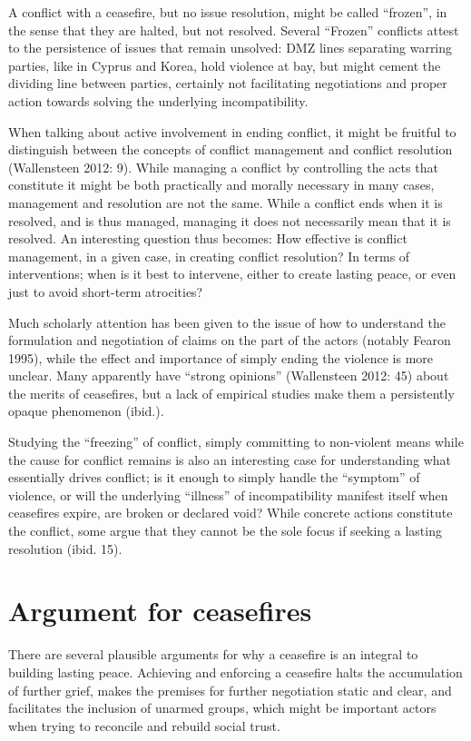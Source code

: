 \documentclass[12pt,twoside]{reedthesis}
\begin{document}
A conflict with a ceasefire, but no issue resolution, might be called
``frozen'', in the sense that they are halted, but not resolved. Several
``Frozen'' conflicts attest to the persistence of issues that remain
unsolved: DMZ lines separating warring parties, like in Cyprus and
Korea, hold violence at bay, but might cement the dividing line between
parties, certainly not facilitating negotiations and proper action
towards solving the underlying incompatibility.

When talking about active involvement in ending conflict, it might be
fruitful to distinguish between the concepts of conflict management and
conflict resolution (Wallensteen 2012: 9). While managing a conflict by
controlling the acts that constitute it might be both practically and
morally necessary in many cases, management and resolution are not the
same. While a conflict ends when it is resolved, and is thus managed,
managing it does not necessarily mean that it is resolved. An
interesting question thus becomes: How effective is conflict management,
in a given case, in creating conflict resolution? In terms of
interventions; when is it best to intervene, either to create lasting
peace, or even just to avoid short-term atrocities?

Much scholarly attention has been given to the issue of how to
understand the formulation and negotiation of claims on the part of the
actors (notably Fearon 1995), while the effect and importance of simply
ending the violence is more unclear. Many apparently have ``strong
opinions'' (Wallensteen 2012: 45) about the merits of ceasefires, but a
lack of empirical studies make them a persistently opaque phenomenon
(ibid.).

Studying the ``freezing'' of conflict, simply committing to non-violent
means while the cause for conflict remains is also an interesting case
for understanding what essentially drives conflict; is it enough to
simply handle the ``symptom'' of violence, or will the underlying
``illness'' of incompatibility manifest itself when ceasefires expire,
are broken or declared void? While concrete actions constitute the
conflict, some argue that they cannot be the sole focus if seeking a
lasting resolution (ibid. 15).

\section{Argument for ceasefires}\label{argument-for-ceasefires}

There are several plausible arguments for why a ceasefire is an integral
to building lasting peace. Achieving and enforcing a ceasefire halts the
accumulation of further grief, makes the premises for further
negotiation static and clear, and facilitates the inclusion of unarmed
groups, which might be important actors when trying to reconcile and
rebuild social trust.
\end{document}
